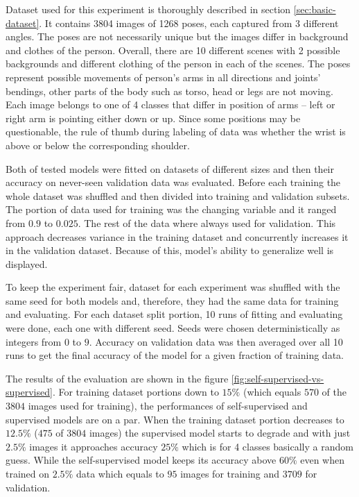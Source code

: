 Dataset used for this experiment is thoroughly described in section \ref{sec:basic-dataset}. It contains 3804 images of 1268 poses, each captured from 3 different angles. The poses are not necessarily unique but the images differ in background and clothes of the person. Overall, there are 10 different scenes with 2 possible backgrounds and different clothing of the person in each of the scenes. The poses represent possible movements of person's arms in all directions and joints' bendings, other parts of the body such as torso, head or legs are not moving. Each image belongs to one of 4 classes that differ in position of arms -- left or right arm is pointing either down or up. Since some positions may be questionable, the rule of thumb during labeling of data was whether the wrist is above or below the corresponding shoulder.

Both of tested models were fitted on datasets of different sizes and then their accuracy on never-seen validation data was evaluated. Before each training the whole dataset was shuffled and then divided into training and validation subsets. The portion of data used for training was the changing variable and it ranged from $0.9$ to $0.025$. The rest of the data where always used for validation. This approach decreases variance in the training dataset and concurrently increases it in the validation dataset. Because of this, model's ability to generalize well is displayed.

To keep the experiment fair, dataset for each experiment was shuffled with the same seed for both models and, therefore, they had the same data for training and evaluating. For each dataset split portion, 10 runs of fitting and evaluating were done, each one with different seed. Seeds were chosen deterministically as integers from $0$ to $9$. Accuracy on validation data was then averaged over all 10 runs to get the final accuracy of the model for a given fraction of training data.

The results of the evaluation are shown in the figure \ref{fig:self-supervised-vs-supervised}. For training dataset portions down to $15 \%$ (which equals $570$ of the $3804$ images used for training), the performances of self-supervised and supervised models are on a par. When the training dataset portion decreases to $12.5 \%$ ($475$ of $3804$ images) the supervised model starts to degrade and with just $2.5 \%$ images it approaches accuracy $25 \%$ which is for 4 classes basically a random guess. While the self-supervised model keeps its accuracy above $60 \%$ even when trained on $2.5 \%$ data which equals to $95$ images for training and $3709$ for validation.

